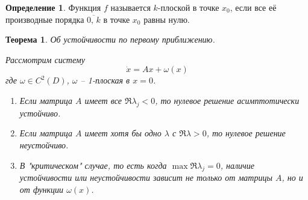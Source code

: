 \documentclass[a4paper,12pt]{article}
\theoremstyle{plain}
\newtheorem{theorem}{Теорема}[section]
\theoremstyle{definition}
\newtheorem{definition}{Определение}[section]
\theoremstyle{remark}
\begin{document}
\begin{definition}
	Функция $f$ называется $k$-плоской в точке $x_0$, если все её производные порядка $\overline{0,\,k}$ в точке $x_0$ равны нулю.
\end{definition}

\begin{theorem}
	Об устойчивости по первому приближению.

	Рассмотрим систему
	\[\dot{x} = Ax + \omega(x)\]
	где $\omega \in C^2(D)$, $\omega$ -- 1-плоская в $x = 0$.

	\begin{enumerate}
		\item Если матрица $A$ имеет все $\Re \lambda_j < 0$, то нулевое решение асимптотически устойчиво.
		\item Если матрица $A$ имеет хотя бы одно $\lambda$ с $\Re \lambda > 0$, то нулевое решение неустойчиво.
		\item В "критическом" случае, то есть когда $\max\Re \lambda_j = 0$, наличие устойчивости или неустойчивости зависит не только от матрицы $A$, но и от функции $\omega(x)$.
	\end{enumerate}
\end{theorem}
\end{document}
